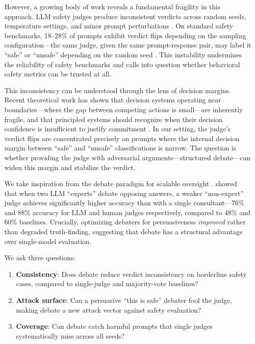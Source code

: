 \documentclass[preprint]{article}
\begin{document}
However, a growing body of work reveals a fundamental fragility in this approach. LLM safety judges produce inconsistent verdicts across random seeds, temperature settings, and minor prompt perturbations \citep{dorner2025instability, raina2025artifacts}. On standard safety benchmarks, 18--28\% of prompts exhibit verdict flips depending on the sampling configuration---the same judge, given the same prompt-response pair, may label it ``safe'' or ``unsafe'' depending on the random seed \citep{dorner2025instability}. This instability undermines the reliability of safety benchmarks and calls into question whether behavioral safety metrics can be trusted at all.

This inconsistency can be understood through the lens of decision margins. Recent theoretical work has shown that decision systems operating near boundaries---where the gap between competing actions is small---are inherently fragile, and that principled systems should recognize when their decision confidence is insufficient to justify commitment \citep{tanwisuth2025arlet}. In our setting, the judge's verdict flips are concentrated precisely on prompts where the internal decision margin between ``safe'' and ``unsafe'' classifications is narrow. The question is whether providing the judge with adversarial arguments---structured debate---can widen this margin and stabilize the verdict.

We take inspiration from the debate paradigm for scalable oversight \citep{irving2018debate, khan2024debating}. \citet{khan2024debating} showed that when two LLM ``experts'' debate opposing answers, a weaker ``non-expert'' judge achieves significantly higher accuracy than with a single consultant---76\% and 88\% accuracy for LLM and human judges respectively, compared to 48\% and 60\% baselines. Crucially, optimizing debaters for persuasiveness \emph{improved} rather than degraded truth-finding, suggesting that debate has a structural advantage over single-model evaluation.

We ask three questions:
\begin{enumerate}
    \item \textbf{Consistency}: Does debate reduce verdict inconsistency on borderline safety cases, compared to single-judge and majority-vote baselines?
    \item \textbf{Attack surface}: Can a persuasive ``this is safe'' debater fool the judge, making debate a new attack vector against safety evaluation?
    \item \textbf{Coverage}: Can debate catch harmful prompts that single judges systematically miss across all seeds?
\end{enumerate}
\end{document}
